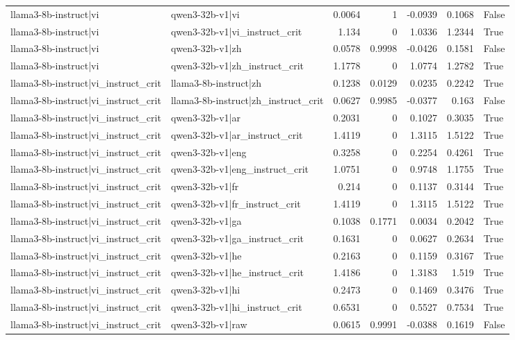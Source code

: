 \begin{table}
\begin{tabular}{l l r r r r l}
llama3-8b-instruct|vi & qwen3-32b-v1|vi & 0.0064 & 1 & -0.0939 & 0.1068 & False \\
llama3-8b-instruct|vi & qwen3-32b-v1|vi_instruct_crit & 1.134 & 0 & 1.0336 & 1.2344 & True \\
llama3-8b-instruct|vi & qwen3-32b-v1|zh & 0.0578 & 0.9998 & -0.0426 & 0.1581 & False \\
llama3-8b-instruct|vi & qwen3-32b-v1|zh_instruct_crit & 1.1778 & 0 & 1.0774 & 1.2782 & True \\
llama3-8b-instruct|vi_instruct_crit & llama3-8b-instruct|zh & 0.1238 & 0.0129 & 0.0235 & 0.2242 & True \\
llama3-8b-instruct|vi_instruct_crit & llama3-8b-instruct|zh_instruct_crit & 0.0627 & 0.9985 & -0.0377 & 0.163 & False \\
llama3-8b-instruct|vi_instruct_crit & qwen3-32b-v1|ar & 0.2031 & 0 & 0.1027 & 0.3035 & True \\
llama3-8b-instruct|vi_instruct_crit & qwen3-32b-v1|ar_instruct_crit & 1.4119 & 0 & 1.3115 & 1.5122 & True \\
llama3-8b-instruct|vi_instruct_crit & qwen3-32b-v1|eng & 0.3258 & 0 & 0.2254 & 0.4261 & True \\
llama3-8b-instruct|vi_instruct_crit & qwen3-32b-v1|eng_instruct_crit & 1.0751 & 0 & 0.9748 & 1.1755 & True \\
llama3-8b-instruct|vi_instruct_crit & qwen3-32b-v1|fr & 0.214 & 0 & 0.1137 & 0.3144 & True \\
llama3-8b-instruct|vi_instruct_crit & qwen3-32b-v1|fr_instruct_crit & 1.4119 & 0 & 1.3115 & 1.5122 & True \\
llama3-8b-instruct|vi_instruct_crit & qwen3-32b-v1|ga & 0.1038 & 0.1771 & 0.0034 & 0.2042 & True \\
llama3-8b-instruct|vi_instruct_crit & qwen3-32b-v1|ga_instruct_crit & 0.1631 & 0 & 0.0627 & 0.2634 & True \\
llama3-8b-instruct|vi_instruct_crit & qwen3-32b-v1|he & 0.2163 & 0 & 0.1159 & 0.3167 & True \\
llama3-8b-instruct|vi_instruct_crit & qwen3-32b-v1|he_instruct_crit & 1.4186 & 0 & 1.3183 & 1.519 & True \\
llama3-8b-instruct|vi_instruct_crit & qwen3-32b-v1|hi & 0.2473 & 0 & 0.1469 & 0.3476 & True \\
llama3-8b-instruct|vi_instruct_crit & qwen3-32b-v1|hi_instruct_crit & 0.6531 & 0 & 0.5527 & 0.7534 & True \\
llama3-8b-instruct|vi_instruct_crit & qwen3-32b-v1|raw & 0.0615 & 0.9991 & -0.0388 & 0.1619 & False \\

\end{tabular}
\end{table}
